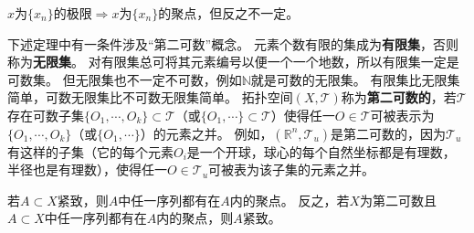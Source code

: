 \begin{note}
	$x$为$\{x_n\}$的极限$\Rightarrow x$为$\{x_n\}$的聚点，但反之不一定。
\end{note}

下述定理中有一条件涉及``第二可数''概念。
元素个数有限的集成为\textbf{有限集}，否则称为\textbf{无限集}。
对有限集总可将其元素编号以便一个一个地数，所以有限集一定是可数集。
但无限集也不一定不可数，例如$\mathbb{N}$就是可数的无限集。
有限集比无限集简单，可数无限集比不可数无限集简单。
拓扑空间$(X, \mathscr{T})$称为\textbf{第二可数的}，若$\mathscr{T}$存在可数子集$\{O_1, \cdots, O_k\} \subset \mathscr{T}$（或$\{O_1, \cdots\} \subset \mathscr{T}$）使得任一$O \in \mathscr{T}$可被表示为$\{O_1, \cdots, O_k\}$（或$\{O_1, \cdots\}$）的元素之并。
例如，$(\mathbb{R}^n, \mathscr{T}_u)$是第二可数的，因为$\mathscr{T}_u$有这样的子集（它的每个元素$O_i$是一个开球，球心的每个自然坐标都是有理数，半径也是有理数），使得任一$O \in \mathscr{T}_u$可被表为该子集的元素之并。

\begin{theorem}
	若$A \subset X$紧致，则$A$中任一序列都有在$A$内的聚点。
	反之，若$X$为第二可数且$A \subset X$中任一序列都有在$A$内的聚点，则$A$紧致。
\end{theorem}
